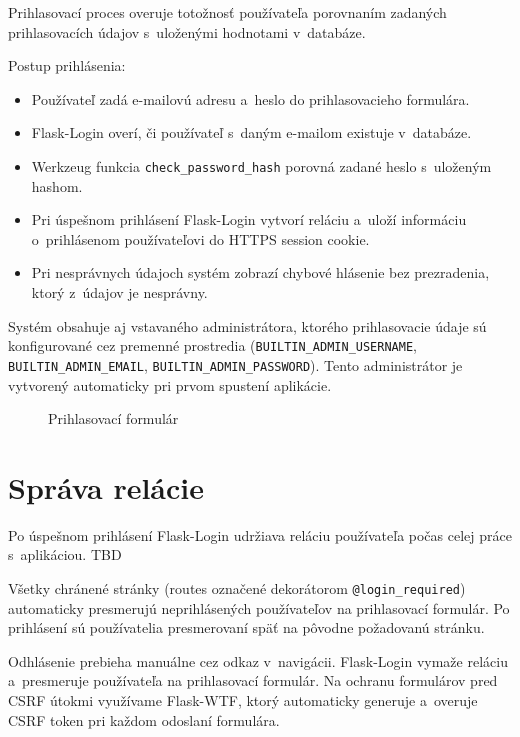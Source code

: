         Prihlasovací proces overuje totožnosť používateľa porovnaním zadaných
prihlasovacích údajov s~uloženými hodnotami v~databáze.

        Postup prihlásenia:

\begin{itemize}
  \item Používateľ zadá e-mailovú adresu a~heslo do prihlasovacieho formulára.
  \item Flask-Login overí, či používateľ s~daným e-mailom existuje v~databáze.
  \item Werkzeug funkcia \texttt{check\_password\_hash} porovná zadané heslo
        s~uloženým hashom.
  \item Pri úspešnom prihlásení Flask-Login vytvorí reláciu a~uloží informáciu
        o~prihlásenom používateľovi do HTTPS session cookie.
  \item Pri nesprávnych údajoch systém zobrazí chybové hlásenie bez prezradenia,
        ktorý z~údajov je nesprávny.
\end{itemize}

        Systém obsahuje aj vstavaného administrátora, ktorého prihlasovacie údaje
sú konfigurované cez premenné prostredia (\texttt{BUILTIN\_ADMIN\_USERNAME},
\texttt{BUILTIN\_ADMIN\_EMAIL}, \texttt{BUILTIN\_ADMIN\_PASSWORD}). Tento
administrátor je vytvorený automaticky pri prvom spustení aplikácie.

\begin{figure}[H]
  \centering
  \caption{Prihlasovací formulár}
  \label{fig:prihlasenie}
\end{figure}

\section{Správa relácie}

        Po úspešnom prihlásení Flask-Login udržiava reláciu používateľa počas
celej práce s~aplikáciou. TBD

        Všetky chránené stránky (routes označené dekorátorom \texttt{@login\_required})
automaticky presmerujú neprihlásených používateľov na prihlasovací formulár.
Po prihlásení sú používatelia presmerovaní späť na pôvodne požadovanú stránku.

        Odhlásenie prebieha manuálne cez odkaz v~navigácii. Flask-Login vymaže
reláciu a~presmeruje používateľa na prihlasovací formulár. Na ochranu formulárov
pred CSRF útokmi využívame Flask-WTF, ktorý automaticky generuje a~overuje
CSRF token pri každom odoslaní formulára.
